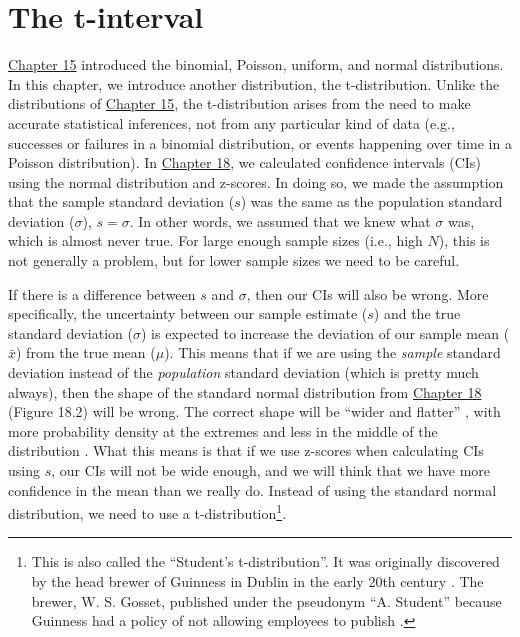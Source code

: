 \documentclass[
]{scrbook}
\begin{document}
\hypertarget{Chapter_19}{%
\chapter{The t-interval}\label{Chapter_19}}

\protect\hyperlink{Chapter_15}{Chapter 15} introduced the binomial, Poisson, uniform, and normal distributions.
In this chapter, we introduce another distribution, the t-distribution.
Unlike the distributions of \protect\hyperlink{Chapter_15}{Chapter 15}, the t-distribution arises from the need to make accurate statistical inferences, not from any particular kind of data (e.g., successes or failures in a binomial distribution, or events happening over time in a Poisson distribution).
In \protect\hyperlink{Chapter_18}{Chapter 18}, we calculated confidence intervals (CIs) using the normal distribution and z-scores.
In doing so, we made the assumption that the sample standard deviation (\(s\)) was the same as the population standard deviation (\(\sigma\)), \(s = \sigma\).
In other words, we assumed that we knew what \(\sigma\) was, which is almost never true.
For large enough sample sizes (i.e., high \(N\)), this is not generally a problem, but for lower sample sizes we need to be careful.

If there is a difference between \(s\) and \(\sigma\), then our CIs will also be wrong.
More specifically, the uncertainty between our sample estimate (\(s\)) and the true standard deviation (\(\sigma\)) is expected to increase the deviation of our sample mean (\(\bar{x}\)) from the true mean (\(\mu\)).
This means that if we are using the \emph{sample} standard deviation instead of the \emph{population} standard deviation (which is pretty much always), then the shape of the standard normal distribution from \protect\hyperlink{Chapter_18}{Chapter 18} (Figure 18.2) will be wrong.
The correct shape will be ``wider and flatter'' \citep{Sokal1995}, with more probability density at the extremes and less in the middle of the distribution \citep{Box1978}.
What this means is that if we use z-scores when calculating CIs using \(s\), our CIs will not be wide enough, and we will think that we have more confidence in the mean than we really do.
Instead of using the standard normal distribution, we need to use a t-distribution\footnote{This is also called the ``Student's t-distribution''. It was originally discovered by the head brewer of Guinness in Dublin in the early 20th century \citep{Box1978}. The brewer, W. S. Gosset, published under the pseudonym ``A. Student'' because Guinness had a policy of not allowing employees to publish \citep{Miller2004}.}.
\end{document}
